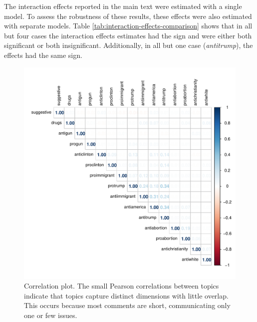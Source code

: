 \documentclass{article}
\begin{document}



\clearpage



\clearpage






The interaction effects reported in the main text were estimated with a single model. To assess the robustness of these results, these effects were also estimated with separate models. Table \ref{tab:interaction-effects-comparison} shows that in all but four cases the interaction effects estimates had the sign and were either both significant or both insignificant. Additionally, in all but one case (\textit{antitrump}), the effects had the same sign.


\clearpage

\clearpage

\begin{figure}[h]
    \centering
    \includegraphics[width=1\linewidth]{figures/corrplot_topics.pdf}
    \caption{Correlation plot. The small Pearson correlations between topics indicate that topics capture distinct dimensions with little overlap. This occurs because most comments are short, communicating only one or few issues.}
    \label{fig:corrplot-topics}
\end{figure}
\clearpage
\end{document}
